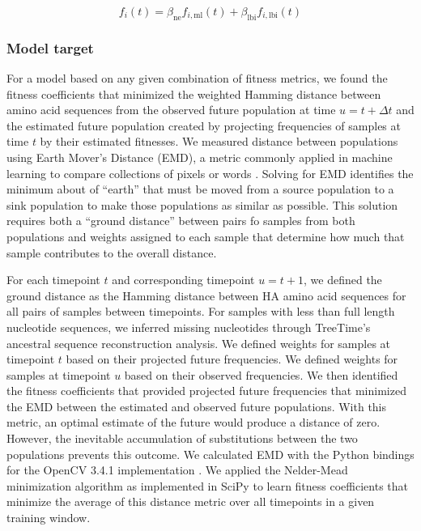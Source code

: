 \begin{equation}
    f_{i}(t) = \beta_{\mathrm{ne}}f_{i, \mathrm{ml}}(t) + \beta_{\mathrm{lbi}}f_{i, \mathrm{lbi}}(t)
    \label{equation_fitness_estimation}
\end{equation}

\subsubsection*{Model target}

For a model based on any given combination of fitness metrics, we found the fitness coefficients that minimized the weighted Hamming distance between amino acid sequences from the observed future population at time $u = t + \Delta{t}$ and the estimated future population created by projecting frequencies of samples at time $t$ by their estimated fitnesses.
We measured distance between populations using Earth Mover's Distance (EMD), a metric commonly applied in machine learning to compare collections of pixels or words \cite{Rubner1998,Kusner2015}.
Solving for EMD identifies the minimum about of ``earth'' that must be moved from a source population to a sink population to make those populations as similar as possible.
This solution requires both a ``ground distance'' between pairs fo samples from both populations and weights assigned to each sample that determine how much that sample contributes to the overall distance.

For each timepoint $t$ and corresponding timepoint $u = t + 1$, we defined the ground distance as the Hamming distance between HA amino acid sequences for all pairs of samples between timepoints.
For samples with less than full length nucleotide sequences, we inferred missing nucleotides through TreeTime's ancestral sequence reconstruction analysis.
We defined weights for samples at timepoint $t$ based on their projected future frequencies.
We defined weights for samples at timepoint $u$ based on their observed frequencies.
We then identified the fitness coefficients that provided projected future frequencies that minimized the EMD between the estimated and observed future populations.
With this metric, an optimal estimate of the future would produce a distance of zero.
However, the inevitable accumulation of substitutions between the two populations prevents this outcome.
We calculated EMD with the Python bindings for the OpenCV 3.4.1 implementation \cite{opencv_library}.
We applied the Nelder-Mead minimization algorithm as implemented in SciPy \cite{SciPy} to learn fitness coefficients that minimize the average of this distance metric over all timepoints in a given training window.

